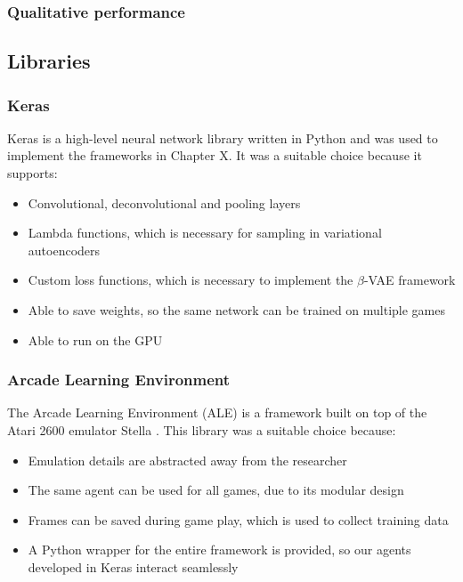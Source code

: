 \documentclass[12pt,twoside]{article}
\begin{document}
\subsubsection{Qualitative performance}

\subsection{Libraries}
\subsubsection{Keras}

Keras is a high-level neural network library written in Python \cite{Chollet2015} and was used to implement the frameworks in Chapter X. It was a suitable choice because it supports:

\begin{itemize}
\item Convolutional, deconvolutional and pooling layers
\item Lambda functions, which is necessary for sampling in variational autoencoders
\item Custom loss functions, which is necessary to implement the $\beta$-VAE framework
\item Able to save weights, so the same network can be trained on multiple games
\item Able to run on the GPU
\end{itemize}

\subsubsection{Arcade Learning Environment}
The Arcade Learning Environment (ALE) is a framework built on top of the Atari 2600 emulator Stella \cite{Bellemare2015}. This library was a suitable choice because:
\begin{itemize}
\item Emulation details are abstracted away from the researcher
\item The same agent can be used for all games, due to its modular design
\item Frames can be saved during game play, which is used to collect training data
\item A Python wrapper for the entire framework is provided, so our agents developed in Keras interact seamlessly
\end{itemize}

\newpage
\end{document}
